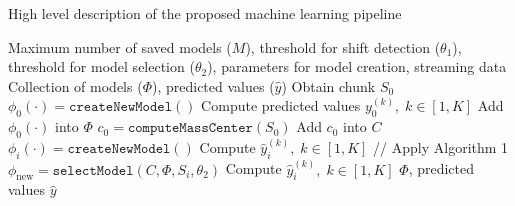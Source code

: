 \documentclass{article}
\begin{document}
\begin{algorithm}[H]
\caption{High level description of the proposed machine learning pipeline}
\begin{algorithmic}[1]
\REQUIRE Maximum number of saved models ($M$), threshold for shift detection ($\theta_1$), threshold for model selection ($\theta_2$), parameters for model creation, streaming data
\ENSURE Collection of models ($\Phi$), predicted values ($\hat{y}$)
\STATE Obtain chunk $S_0$
\STATE $\phi_0(\cdot) = \texttt{createNewModel}()$
\STATE Compute predicted values $y_0^{(k)},\; k \in [1, K]$
\STATE Add $\phi_0(\cdot)$ into $\Phi$
\STATE $c_0 = \texttt{computeMassCenter}(S_0)$
\STATE Add $c_0$ into $C$
    \STATE $\phi_i(\cdot) = \texttt{createNewModel}()$
    \STATE Compute $\hat{y}_i^{(k)},\; k \in [1, K]$
        \STATE // Apply Algorithm 1
        \STATE $\phi_{\text{new}} = \texttt{selectModel}(C, \Phi, S_i, \theta_2)$
        \STATE Compute $\hat{y}_i^{(k)},\; k \in [1, K]$
    \ENDIF
\ENDWHILE
\RETURN $\Phi$, predicted values $\hat{y}$
\end{algorithmic}
\end{algorithm}
\end{document}
